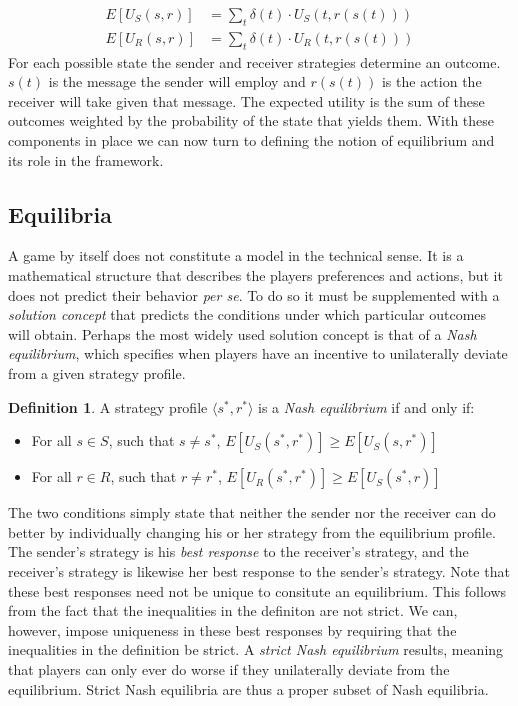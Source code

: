 \documentclass[12pt]{article}
\theoremstyle{definition} \newtheorem{definition}{Definition}
\begin{document}
\begin{equation}
\begin{split}
 E[U_{S}(s,r)] &= \sum_{t} \delta (t) \cdot U_S(t, r(s(t)))\\
 E[U_{R}(s,r)] &= \sum_{t} \delta (t) \cdot U_R(t, r(s(t)))
\end{split}
\end{equation}
For each possible state the sender and receiver strategies determine an outcome. $s(t)$ is the message the sender will employ and $r(s(t))$ is the action the receiver will take given that message. The expected utility is the sum of these outcomes weighted by the probability of the state that yields them. With these components in place we can now turn to defining the notion of equilibrium and its role in the framework.


\subsection{Equilibria}

A game by itself does not constitute a model in the technical sense. It is a mathematical structure that describes the players preferences and actions, but it does not predict their behavior \emph{per se}. To do so it must be supplemented with a \emph{solution concept} that predicts the conditions under which particular outcomes will obtain. Perhaps the most widely used solution concept is that of a \emph{Nash equilibrium}, which specifies when players have an incentive to unilaterally deviate from a given strategy profile.

\begin{definition}
 A strategy profile $\langle s^*, r^*\rangle$ is a \emph{Nash equilibrium}
if and only if:
  \begin{itemize}
   \item For all $s \in S$, such that $s \neq s^*$, $E[U_S(s^*,r^*)] \geq
E[U_S(s,r^*)]$
  \item For all $r \in R$, such that $r \neq r^*$, $E[U_R(s^*,r^*)] \geq
E[U_S(s^*,r)]$
  \end{itemize}
\end{definition}

The two conditions simply state that neither the sender nor the receiver can do better by individually changing his or her strategy from the equilibrium profile.  The sender's strategy is his \emph{best response} to the receiver's strategy, and the receiver's strategy is likewise her best response to the sender's strategy. Note that these best responses need not be unique to consitute an equilibrium. This follows from the fact that the inequalities in the definiton are not strict. We can, however, impose uniqueness in these best responses by requiring that the inequalities in the definition be strict. A \emph{strict Nash equilibrium} results, meaning that players can only ever do worse if they unilaterally deviate from the equilibrium. Strict Nash equilibria are thus a proper subset of Nash equilibria.
\end{document}
